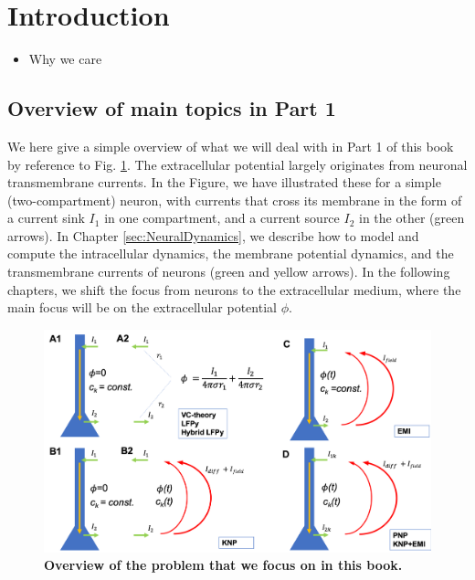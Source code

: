 \section{Introduction} 
\label{sec:Introduction}

\begin{itemize}
\item Why we care \citep{Buzsaki2012,Pettersen2012,Einevoll2013,Einevoll2013a,Einevoll2019}
\end{itemize}


\subsection{Overview of main topics in Part 1}


We here give a simple overview of what we will deal with in Part 1 of this book by reference to Fig. \ref{fig:Knallfigur}. The extracellular potential largely originates from neuronal transmembrane currents. In the Figure, we have illustrated these for a simple (two-compartment) neuron, with currents that cross its membrane in the form of a current sink $I_1$ in one compartment, and a current source $I_2$ in the other (green arrows). In Chapter \ref{sec:NeuralDynamics}, we describe how to model and compute the intracellular dynamics, the membrane potential dynamics, and the transmembrane currents of neurons (green and yellow arrows). In the following chapters, we shift the focus from neurons to the extracellular medium, where the main focus will be on the extracellular potential $\phi$.

\begin{figure}[!ht]
\begin{center}
\includegraphics[width=1\textwidth]{Figures/Skjemaoversikt.png}
\end{center}
\caption{\textbf{Overview of the problem that we focus on in this book.} 
}
\label{fig:Knallfigur}
\end{figure}

